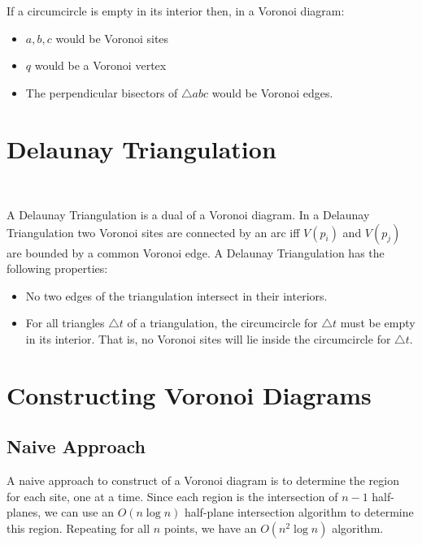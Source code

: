 \documentclass[10pt]{article}
\begin{document}
\begin{center}
\end{center}

If a circumcircle is empty in its interior then, in a Voronoi diagram:
\begin{itemize}
\item $a,b,c$ would be Voronoi sites
\item $q$ would be a Voronoi vertex
\item The perpendicular bisectors of $\triangle abc$ would be Voronoi
edges.
\end{itemize}


\section{Delaunay Triangulation}

\begin{center}
 \\
\end{center}
A Delaunay Triangulation is a dual of a Voronoi diagram.  In a
Delaunay Triangulation two Voronoi sites are connected by an arc
iff $V(p_i)$ and $V(p_j)$ are bounded by a common Voronoi edge.  A
Delaunay Triangulation has the following properties:
\begin{itemize}
\item No two edges of the triangulation intersect in their interiors.
\item For all triangles $\triangle t$ of a triangulation, the
circumcircle for $\triangle t$ must be empty in its interior.  That
is, no Voronoi sites will lie inside the circumcircle for $\triangle
t$. 
\end{itemize}

\section{Constructing Voronoi Diagrams}

\subsection{Naive Approach}

A naive approach to construct of a Voronoi diagram is to determine the
region for each site, one at a time.  Since each region is the
intersection of $n-1$ half-planes, we can use an $O(n \log n)$
half-plane intersection algorithm to determine this region.  Repeating
for all $n$ points, we have an $O(n^2 \log n)$ algorithm.
\end{document}
